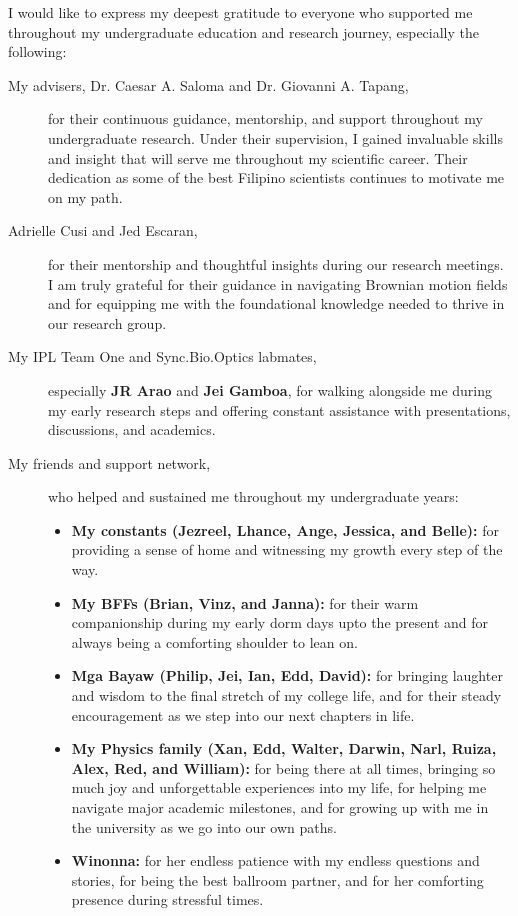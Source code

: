 \noindent I would like to express my deepest gratitude to everyone who supported me throughout my undergraduate education and research journey, especially the following:

\begin{description}

    \item[My advisers, Dr. Caesar A. Saloma and Dr. Giovanni A. Tapang,] 
    for their continuous guidance, mentorship, and support throughout my undergraduate research. Under their supervision, I gained invaluable skills and insight that will serve me throughout my scientific career. Their dedication as some of the best Filipino scientists continues to motivate me on my path.

    \item[Adrielle Cusi and Jed Escaran,] 
    for their mentorship and thoughtful insights during our research meetings. I am truly grateful for their guidance in navigating Brownian motion fields and for equipping me with the foundational knowledge needed to thrive in our research group.

    \item[My IPL Team One and Sync.Bio.Optics labmates,] 
    especially \textbf{JR Arao} and \textbf{Jei Gamboa}, for walking alongside me during my early research steps and offering constant assistance with presentations, discussions, and academics.

    \item[My friends and support network,] 
    who helped and sustained me throughout my undergraduate years:
    \begin{itemize}
        \item \textbf{My constants (Jezreel, Lhance, Ange, Jessica, and Belle):} for providing a sense of home and witnessing my growth every step of the way.
        \item \textbf{My BFFs (Brian, Vinz, and Janna):} for their warm companionship during my early dorm days upto the present and for always being a comforting shoulder to lean on.
        \item \textbf{Mga Bayaw (Philip, Jei, Ian, Edd, David):} for bringing laughter and wisdom to the final stretch of my college life, and for their steady encouragement as we step into our next chapters in life.
        \item \textbf{My Physics family (Xan, Edd, Walter, Darwin, Narl, Ruiza, Alex, Red, and William):} for being there at all times, bringing so much joy and unforgettable experiences into my life, for helping me navigate major academic milestones, and for growing up with me in the university as we go into our own paths.
        \item \textbf{Winonna:} for her endless patience with my endless questions and stories, for being the best ballroom partner, and for her comforting presence during stressful times.
    \end{itemize}


\end{description}
